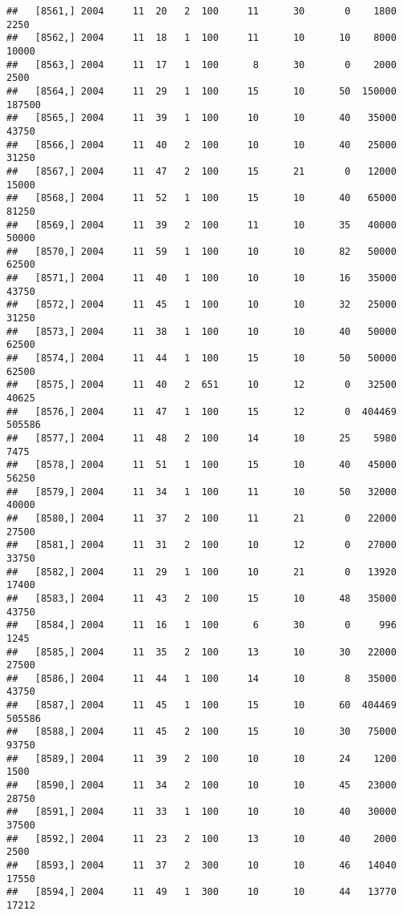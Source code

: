 \documentclass{article}\usepackage[]{graphicx}\usepackage[]{color}
\makeatletter
\newenvironment{kframe}{%
 \def\at@end@of@kframe{}%
 \ifinner\ifhmode%
  \def\at@end@of@kframe{\end{minipage}}%
  \begin{minipage}{\columnwidth}%
 \fi\fi%
 \def\FrameCommand##1{\hskip\@totalleftmargin \hskip-\fboxsep
 \colorbox{shadecolor}{##1}\hskip-\fboxsep
     \hskip-\linewidth \hskip-\@totalleftmargin \hskip\columnwidth}%
 \MakeFramed {\advance\hsize-\width
   \@totalleftmargin\z@ \linewidth\hsize
   \@setminipage}}%
 {\par\unskip\endMakeFramed%
 \at@end@of@kframe}
\newenvironment{knitrout}{}{} %
\makeatother
\begin{document}
\begin{knitrout}
\begin{kframe}
\begin{verbatim}
##   [8561,] 2004     11  20   2  100     11      30       0    1800    2250
##   [8562,] 2004     11  18   1  100     11      10      10    8000   10000
##   [8563,] 2004     11  17   1  100      8      30       0    2000    2500
##   [8564,] 2004     11  29   1  100     15      10      50  150000  187500
##   [8565,] 2004     11  39   1  100     10      10      40   35000   43750
##   [8566,] 2004     11  40   2  100     10      10      40   25000   31250
##   [8567,] 2004     11  47   2  100     15      21       0   12000   15000
##   [8568,] 2004     11  52   1  100     15      10      40   65000   81250
##   [8569,] 2004     11  39   2  100     11      10      35   40000   50000
##   [8570,] 2004     11  59   1  100     10      10      82   50000   62500
##   [8571,] 2004     11  40   1  100     10      10      16   35000   43750
##   [8572,] 2004     11  45   1  100     10      10      32   25000   31250
##   [8573,] 2004     11  38   1  100     10      10      40   50000   62500
##   [8574,] 2004     11  44   1  100     15      10      50   50000   62500
##   [8575,] 2004     11  40   2  651     10      12       0   32500   40625
##   [8576,] 2004     11  47   1  100     15      12       0  404469  505586
##   [8577,] 2004     11  48   2  100     14      10      25    5980    7475
##   [8578,] 2004     11  51   1  100     15      10      40   45000   56250
##   [8579,] 2004     11  34   1  100     11      10      50   32000   40000
##   [8580,] 2004     11  37   2  100     11      21       0   22000   27500
##   [8581,] 2004     11  31   2  100     10      12       0   27000   33750
##   [8582,] 2004     11  29   1  100     10      21       0   13920   17400
##   [8583,] 2004     11  43   2  100     15      10      48   35000   43750
##   [8584,] 2004     11  16   1  100      6      30       0     996    1245
##   [8585,] 2004     11  35   2  100     13      10      30   22000   27500
##   [8586,] 2004     11  44   1  100     14      10       8   35000   43750
##   [8587,] 2004     11  45   1  100     15      10      60  404469  505586
##   [8588,] 2004     11  45   2  100     15      10      30   75000   93750
##   [8589,] 2004     11  39   2  100     10      10      24    1200    1500
##   [8590,] 2004     11  34   2  100     10      10      45   23000   28750
##   [8591,] 2004     11  33   1  100     10      10      40   30000   37500
##   [8592,] 2004     11  23   2  100     13      10      40    2000    2500
##   [8593,] 2004     11  37   2  300     10      10      46   14040   17550
##   [8594,] 2004     11  49   1  300     10      10      44   13770   17212

\end{verbatim}
\end{kframe}
\end{knitrout}
\end{document}
